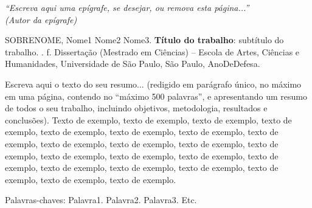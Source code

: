 \documentclass[
	12pt,				%
	oneside,			%
	a4paper,			%
	english,			%
	brazil				%
	]{abntex2ppgsi}
\begin{document}
%
% 
\begin{epigrafe}
    \vspace*{\fill}
	\begin{flushright}
		\textit{``Escreva aqui uma epígrafe, se desejar, ou remova esta página...''\\
		(Autor da epígrafe)}
	\end{flushright}
\end{epigrafe}


\setlength{\absparsep}{18pt} %
\begin{resumo}

% 
%
% 
%
\begin{flushleft}
SOBRENOME, Nome1 Nome2 Nome3. \textbf{Título do trabalho}: subtítulo do trabalho. \imprimirdata. \pageref{LastPage} f. Dissertação (Mestrado em Ciências) – Escola de Artes, Ciências e Humanidades, Universidade de São Paulo, São Paulo, AnoDeDefesa.
\end{flushleft}

Escreva aqui o texto do seu resumo... (redigido em parágrafo único, no máximo em uma página, contendo no ``máximo 500 palavras'', e apresentando um resumo de todos o seu trabalho, incluindo objetivos, metodologia, resultados e conclusões). Texto de exemplo, texto de exemplo, texto de exemplo, texto de exemplo, texto de exemplo, texto de exemplo, texto de exemplo, texto de exemplo, texto de exemplo, texto de exemplo, texto de exemplo, texto de exemplo, texto de exemplo, texto de exemplo, texto de exemplo, texto de exemplo, texto de exemplo, texto de exemplo, texto de exemplo, texto de exemplo, texto de exemplo, texto de exemplo.

Palavras-chaves: Palavra1. Palavra2. Palavra3. Etc.
\end{resumo}
\end{document}
